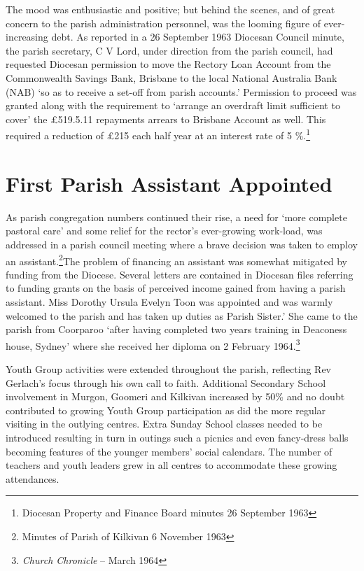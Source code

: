 The mood was enthusiastic and positive; but behind the scenes, and of great concern to the parish administration personnel, was the looming figure of ever-increasing debt. As reported in a 26 September 1963 Diocesan Council minute, the parish secretary, C V Lord, under direction from the parish council, had requested Diocesan permission to move the Rectory Loan Account from the Commonwealth Savings Bank, Brisbane to the local National Australia Bank (NAB) `so as to receive a set-off from parish accounts.' Permission to proceed was granted along with the requirement to `arrange an overdraft limit sufficient to cover' the \pounds519.5.11 repayments arrears to Brisbane Account as well. This required a reduction of \pounds215 each half year at an interest rate of 5  \%.\footnote{Diocesan Property and Finance Board minutes 26 September 1963}


\section{First Parish Assistant Appointed}



As parish congregation numbers continued their rise, a need for `more complete pastoral care' and some relief for the rector's ever-growing work-load, was addressed in a parish council meeting where a brave decision was taken to employ an assistant.\footnote{Minutes of Parish of Kilkivan 6 November 1963}The problem of financing an assistant was somewhat mitigated by funding from the Diocese. Several letters are contained in Diocesan files referring to funding grants on the basis of perceived income gained from having a parish assistant. Miss Dorothy Ursula Evelyn Toon was appointed and was warmly welcomed to the parish and has taken up duties as Parish Sister.' She came to the parish from Coorparoo `after having completed two years training in Deaconess house, Sydney' where she received her diploma on 2 February 1964.\footnote{\emph{Church Chronicle} -- March 1964}


Youth Group activities were extended throughout the parish, reflecting Rev Gerlach's focus through his own call to faith. Additional Secondary School involvement in Murgon, Goomeri and Kilkivan increased by 50\% and no doubt contributed to growing Youth Group participation as did the more regular visiting in the outlying centres. Extra Sunday School classes needed to be introduced resulting in turn in outings such a picnics and even fancy-dress balls becoming features of the younger members' social calendars. The number of teachers and youth leaders grew in all centres to accommodate these growing attendances.



